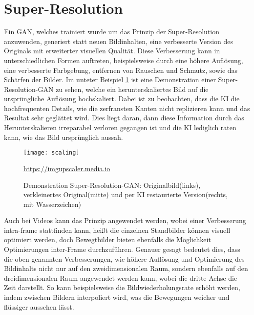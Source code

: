 \section{Super-Resolution}

\noindent Ein \ac{GAN}, welches trainiert wurde um das Prinzip der Super-Resolution anzuwenden, generiert statt neuen Bildinhalten, eine verbesserte Version des Originals mit erweiterter visuellen Qualität. Diese Verbesserung kann in unterschiedlichen Formen auftreten, beispielsweise durch eine höhere Auflösung, eine verbesserte Farbgebung, entfernen von Rauschen und Schmutz, sowie das Schärfen der Bilder. Im unteter Beispiel \ref{fig:scaling} ist eine Demonstration einer Super-Resolution-GAN zu sehen, welche ein herunterskaliertes Bild auf die ursprüngliche Auflösung hochskaliert. Dabei ist zu beobachten, dass die KI die hochfrequenten Details, wie die zerfransten Kanten nicht replizieren kann und das Resultat sehr geglättet wird. Dies liegt daran, dann diese Information durch das Herunterskalieren irreparabel verloren gegangen ist und die KI lediglich raten kann, wie das Bild ursprünglich aussah.\\


\begin{figure}[H]
    \centering
    \texttt{[image: scaling]}
    \caption{Demonstration Super-Resolution-GAN: Originalbild(links), verkleinertes Original(mitte) und per KI restaurierte Version(rechts, mit Wasserzeichen)} \quelle\url{https://imgupscaler.media.io}
\label{fig:scaling}
\end{figure}


\noindent Auch bei Videos kann das Prinzip angewendet werden, wobei einer Verbesserung intra-frame stattfinden kann, heißt die einzelnen Standbilder können visuell optimiert werden, doch Bewegtbilder bieten ebenfalls die Möglichkeit Optimierungen inter-Frame durchzuführen. Genauer gesagt bedeutet dies, dass die oben genannten Verbesserungen, wie höhere Auflösung und Optimierung des Bildinhalts nicht nur auf den zweidimensionalen Raum, sondern ebenfalls auf den dreidimensionalen Raum angewendet werden kann, wobei die dritte Achse die Zeit darstellt. So kann beispielsweise die Bildwiederholungsrate erhöht werden, indem zwischen Bildern interpoliert wird, was die Bewegungen weicher und flüssiger aussehen lässt.
\newpage